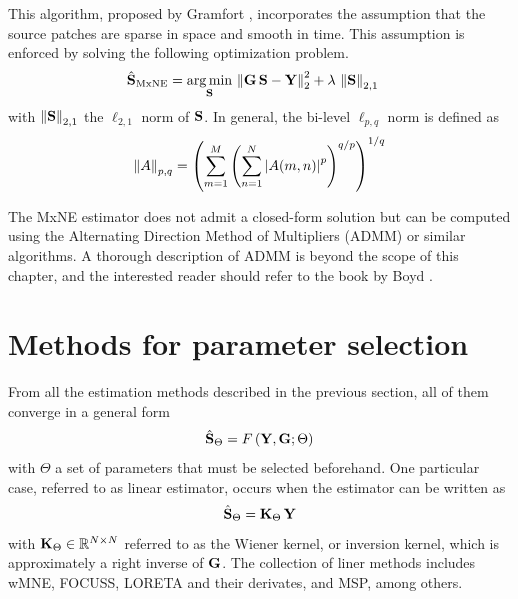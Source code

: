 This algorithm, proposed by Gramfort \cite{gramfort2012mixed}, incorporates the assumption that the source patches are sparse in space and smooth in time.
%
This assumption is enforced by solving the following optimization problem.
\begin{align}
\hat{\mathbf{S}}_\text{MxNE} &=
\operatorname*{arg\,min}_{\mathbf{S}}\, \left\lVert \mathbf{G}\, \mathbf{S} - \mathbf{Y}  \right\rVert_2^2 + \lambda\, \left\lVert \mathbf{S} \right\rVert_{2,1}
\label{est:MxNE}
\end{align}
with $\left\lVert \mathbf{S} \right\rVert_{2,1}$ the $\ell_{2,1}$ norm of $\mathbf{S}$.
%
In general, the bi-level $\ell_{p,q}$ norm is defined as
\begin{equation}
\left\lVert A \right\rVert_{p,q} =
\left( \sum_{m=1}^M \left(  \sum_{n=1}^N \left| {A(m,n)} \right|^p  \right)^{q/p} \right)^{1/q}
\end{equation}

The MxNE estimator does not admit a closed-form solution but can be computed using the Alternating Direction Method of Multipliers (ADMM) or similar algorithms.
%
A thorough description of ADMM is beyond the scope of this chapter, and the interested reader should refer to the book by Boyd \cite{boyd2011admm}.

\section{Methods for parameter selection}

From all the estimation methods described in the previous section, all of them converge in a general form
\begin{equation}
\hat{\mathbf{S}}_\Theta = F\left(  \mathbf{Y}, \mathbf{G}; \Theta  \right)
\end{equation}
with $\Theta$ a set of parameters that must be selected beforehand.
%
One particular case, referred to as linear estimator, occurs when the estimator can be written as
\begin{equation}
\hat{\mathbf{S}}_\Theta
=
\mathbf{K}_{\Theta}\, \mathbf{Y}
\end{equation}
with $\mathbf{K}_{\Theta} \in \mathbb{R}^{N\times N}$ referred to as the Wiener kernel, or inversion kernel, which is approximately a right inverse of $\mathbf{G}$.
%
The collection of liner methods includes wMNE, FOCUSS, LORETA and their derivates, and MSP, among others. 

